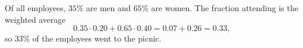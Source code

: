 Of all employees, $35\%$ are men and $65\%$ are women. The fraction attending is the weighted average
\[0.35\cdot0.20+0.65\cdot0.40=0.07+0.26=0.33,\]
so $\boxed{33\%}$ of the employees went to the picnic.

